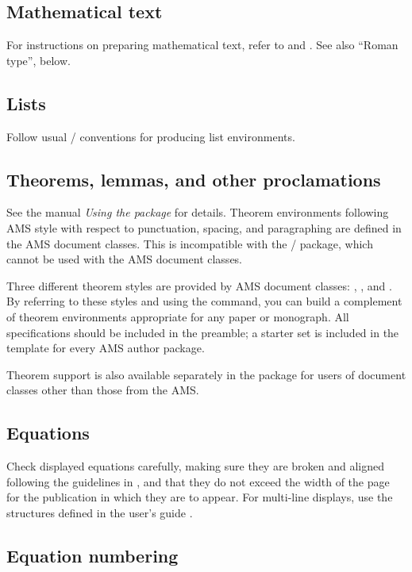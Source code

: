 \subsection{Mathematical text}
For instructions on preparing mathematical text, refer to
\cite{AMG} and \cite{Gr}.  See also ``Roman type'', below.

\subsection{Lists}
Follow usual \latex/ conventions for producing list environments.

\subsection{Theorems, lemmas, and other proclamations}
See the manual \textit{Using the  package} \cite{ATH}
for details.  Theorem environments following AMS style with respect to
punctuation, spacing, and paragraphing are defined in the AMS document
classes.  This is incompatible with the \latex/  package,
which cannot be used with the AMS document classes.

Three different theorem styles are provided by AMS document classes:
, , and . By referring to these
styles and using the  command, you can build a
complement of theorem environments appropriate for any paper or
monograph.  All  specifications should be included in
the preamble; a starter set is included in the template for every
AMS author package.

Theorem support is also available separately in the  package
for users of document classes other than those from the AMS.

\subsection{Equations}
Check displayed equations carefully, making sure they are broken and
aligned following the guidelines in \cite[pp.\ 44--48]{Sw}, and that
they do not exceed the width of the page for the publication in which
they are to appear.  For
multi-line displays, use the structures defined in the 
user's guide \cite{AMG}.

\subsection{Equation numbering}\label{ssec:eqnum}


